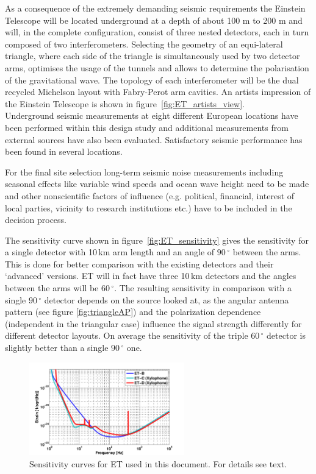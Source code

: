 As a consequence of the extremely demanding seismic requirements the Einstein Telescope will be located underground at a depth of about 100 m to 200 m and will, in the complete configuration, consist of three nested detectors, each in turn composed of two interferometers. Selecting the geometry of an equi-lateral triangle, where each side of the triangle is simultaneously used by two detector arms, optimises the usage of the tunnels and allows to determine the polarisation of the gravitational wave. The topology of each interferometer will be the dual recycled Michelson layout with Fabry-Perot arm cavities. An artists impression of the Einstein Telescope is shown in figure~\ref{fig:ET_artists_view}. \\
Underground seismic measurements at eight different European locations have been performed within this design study and additional measurements from external sources have also been evaluated. Satisfactory seismic performance has been found in several locations. 

For the final site selection long-term seismic noise measurements including seasonal effects like variable wind speeds and ocean wave height need to be made and other nonscientific factors of influence (e.g. political, financial, interest of local parties, vicinity to research institutions etc.) have to be included in the decision process.

The sensitivity curve shown in figure~\ref{fig:ET_sensitivity} gives the sensitivity for a single detector with 10\,km arm length and an angle of $90\,^{\circ}$ between the arms. This is done for better comparison with the existing detectors and their `advanced' versions. ET will in fact have three 10\,km detectors and the angles between the arms will be $60\,^{\circ}$. The resulting sensitivity in comparison with a single $90\,^{\circ}$ detector depends on the source looked at, as the angular antenna pattern (see figure \ref{fig:triangleAP}) and the polarization dependence (independent in the triangular case) influence the signal strength differently for different detector layouts. On average the sensitivity of the triple $60\,^{\circ}$ detector is slightly better than a single $90\,^{\circ}$ one.

\newpage 

\begin{figure}
	\centering
		\includegraphics[width=0.6\textwidth]{Sec_Introduction/all_sens3.pdf}
	\caption{Sensitivity curves for ET used in this document. For details see text.}
	\label{fig:ET_sens_evolution_2}
\end{figure}

